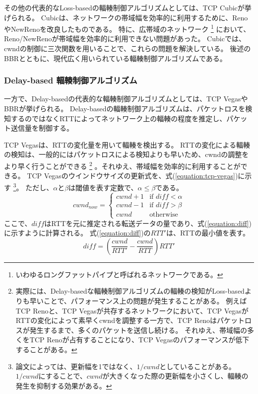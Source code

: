 \documentclass[a4paper,11pt]{jreport}
\newcommand{\equationref}[1]{式(\ref{#1})}
\begin{document}
その他の代表的なLoss-basedの輻輳制御アルゴリズムとしては、TCP Cubic\cite{cubic}が挙げられる。
Cubicは、ネットワークの帯域幅を効率的に利用するために、RenoやNewRenoを改良したものである。
特に、広帯域のネットワーク
\footnote{いわゆるロングファットパイプと呼ばれるネットワークである。}
において、Reno/NewRenoが帯域幅を効率的に利用できない問題があった。
Cubicでは、cwndの制御に三次関数を用いることで、これらの問題を解決している。
後述のBBR\cite{bbr}とともに、現代広く用いられている輻輳制御アルゴリズムである。

\subsubsection*{Delay-based 輻輳制御アルゴリズム}

一方で、Delay-basedの代表的な輻輳制御アルゴリズムとしては、TCP Vegas\cite{tcp-vegas}やBBR\cite{bbr}が挙げられる。
Delay-basedの輻輳制御アルゴリズムは、パケットロスを検知するのではなくRTTによってネットワーク上の輻輳の程度を推定し、パケット送信量を制御する。

TCP Vegasは、RTTの変化量を用いて輻輳を検出する。
RTTの変化による輻輳の検知は、一般的にはパケットロスによる検知よりも早いため、cwndの調整をより早く行うことができる
\footnote{実際には、Delay-basedな輻輳制御アルゴリズムの輻輳の検知がLoss-basedよりも早いことで、パフォーマンス上の問題が発生することがある。
例えばTCP Renoと、TCP Vegasが共存するネットワークにおいて、TCP VegasがRTTの変化によって素早くcwndを調整する一方で、TCP Renoはパケットロスが発生するまで、多くのパケットを送信し続ける。
それゆえ、帯域幅の多くをTCP Renoが占有することになり、TCP Vegasのパフォーマンスが低下することがある。
}
。それゆえ、帯域幅を効率的に利用することができる。
TCP Vegasのウインドウサイズの更新式を、\equationref{equation:tcp-vegas}に示す
\footnote{論文によっては、更新幅を1ではなく、$1/cwnd$としていることがある。
$1/cwnd$にすることで、$cwnd$が大きくなった際の更新幅を小さくし、輻輳の発生を抑制する効果がある。}。
ただし、$\alpha$と$\beta$は閾値を表す定数で、$\alpha \leq \beta$である。
\begin{equation}
  \label{equation:tcp-vegas}
  cwnd_{now} =
  \begin{cases}
    cwnd + 1 & \text{if } diff < \alpha \\
    cwnd - 1 & \text{if } diff > \beta \\
    cwnd & \text{otherwise}
  \end{cases}
\end{equation}
ここで、$diff$はRTTを元に推定される転送データの量であり、\equationref{equation:diff}に示すように計算される。
\equationref{equation:diff}の$RTT'$は、RTTの最小値を表す。
\begin{equation}
  \label{equation:diff}
  diff = \left( \frac{cwnd}{RTT'} - \frac{cwnd}{RTT}\right) RTT'
\end{equation}
\end{document}
